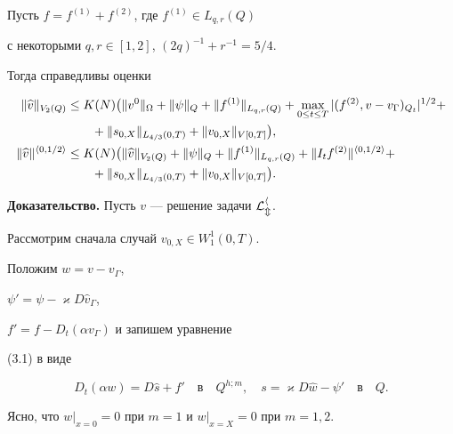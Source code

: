 \begin{props}


Пусть $f=f^{(1)}+f^{(2)}$, где $f^{(1)}\in L_{q,r}(Q)$


с некоторыми $q,r\in [1,2]$, $(2q)^{-1}+r^{-1}=5/4$.


Тогда справедливы оценки


\begin{align}


\|\widehat v\|_{V_2(Q)}&\le K(N)


\big(\|v^0\|_\Omega +


\|\psi\|_Q + \|f^{(1)}\|_{L_{q,r}(Q)}


+\max_{0\le t\le T}|(f^{(2)},v-v_{\Gamma})_{Q_t}|^{1/2}+\notag \\


&\qquad+\|s_{0,X}\|_{L_{4/3}(0,T)}+\|v_{0,X}\|_{V[0,T]}\big),\\


\|\widehat v\|^{\langle 0,1/2\rangle}&\le K(N)


\big(\|\widehat v\|_{V_2(Q)}+\|\psi\|_Q + \|f^{(1)}\|_{L_{q,r}(Q)}+


\|I_tf^{(2)}\|^{\langle 0,1/2\rangle}+\notag \\


&\qquad+\|s_{0,X}\|_{L_{4/3}(0,T)}+ \|v_{0,X}\|_{V[0,T]}\big).


\end{align}


\end{props}





{\bf Доказательство.} Пусть $v$ --- решение задачи $\cal L_m^h$.


Рассмотрим сначала случай $v_{0,X}\in W_1^1(0,T)$.


Положим $w=v-v_\Gamma$,


$\psi'=\psi-\varkappa D\widehat v_\Gamma$,


$f'=f-D_t(\alpha v_\Gamma)$ и запишем уравнение


(3.1) в виде


\begin{equation}


D_t(\alpha w) = D\widehat s + f'\quad\text{в}\quad Q^{h;m},


\quad s=\varkappa D\widehat w-\psi'\quad\text{в}\quad Q.


\end{equation}


Ясно, что $w|_{x=0}=0$ при $m=1$ и $w|_{x=X}=0$ при $m=1,2$.


